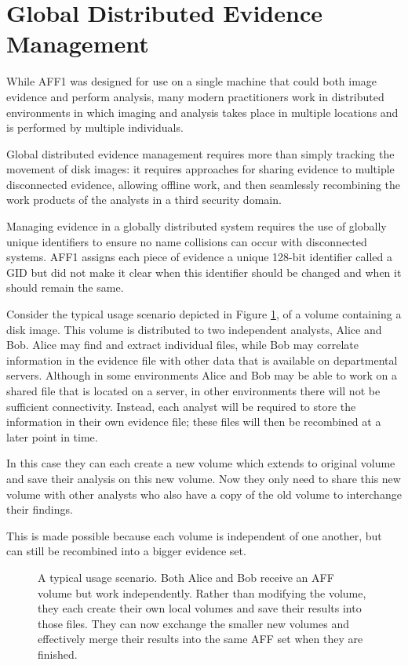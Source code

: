 \documentclass[10pt, conference]{IEEEtran}
\begin{document}
\section{Global Distributed Evidence Management}
While AFF1 was designed for use on a single machine that could both
image evidence and perform analysis, many modern practitioners work in
distributed environments in which imaging and analysis takes place in
multiple locations and is performed by multiple individuals. 


Global distributed evidence management requires more than simply
tracking the movement of disk images: it requires approaches for
sharing evidence to multiple disconnected evidence, allowing offline
work, and then seamlessly recombining the work products of the
analysts in a third security domain.

Managing evidence in a globally distributed system requires the use of
globally unique identifiers to ensure no name collisions can occur
with disconnected systems. AFF1 assigns each piece of evidence a
unique 128-bit identifier called a GID but did not make it clear when
this identifier should be changed and when it should remain the same.

Consider the typical usage scenario depicted in Figure \ref{usage}, of
a volume containing a disk image. This volume is distributed to two
independent analysts, Alice and Bob. Alice may find and extract
individual files, while Bob may correlate information in the evidence
file with other data that is available on departmental
servers. Although in some environments Alice and Bob may be able to
work on a shared file that is located on a server, in other
environments there will not be sufficient connectivity. Instead, each
analyst will be required to store the information in their own
evidence file; these files will then be recombined at a later point in
time.

In this case they can each create a new volume which extends to
original volume and save their analysis on this new volume. Now they
only need to share this new volume with other analysts who also have a
copy of the old volume to interchange their findings.

This is made possible because each volume is independent of one
another, but can still be recombined into a bigger evidence set. 

\begin{figure}[tb]
  \begin{center}
  \mbox{\columnwidth {}}
  \caption{A typical usage scenario. Both Alice and Bob receive an AFF
  volume but work independently. Rather than modifying the volume,
  they each create their own local volumes and save their results into
  those files. They can now exchange the smaller new volumes and
  effectively merge their results into the same AFF set when they are finished.}
  \label{usage}
  \end{center}
\end{figure}
\end{document}

